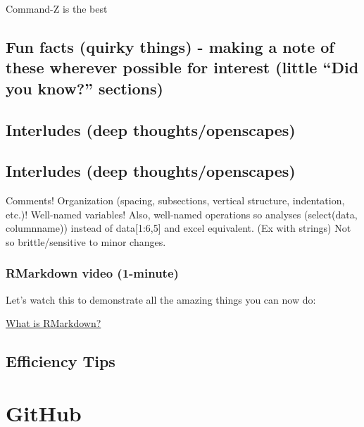 \documentclass[]{book}
\begin{document}
Command-Z is the best

\hypertarget{fun-facts-quirky-things---making-a-note-of-these-wherever-possible-for-interest-little-did-you-know-sections}{%
\section{Fun facts (quirky things) - making a note of these wherever possible for interest (little ``Did you know?'' sections)}\label{fun-facts-quirky-things---making-a-note-of-these-wherever-possible-for-interest-little-did-you-know-sections}}

\hypertarget{interludes-deep-thoughtsopenscapes}{%
\section{Interludes (deep thoughts/openscapes)}\label{interludes-deep-thoughtsopenscapes}}

\hypertarget{interludes-deep-thoughtsopenscapes-1}{%
\section{Interludes (deep thoughts/openscapes)}\label{interludes-deep-thoughtsopenscapes-1}}

Comments! Organization (spacing, subsections, vertical structure, indentation, etc.)! Well-named variables! Also, well-named operations so analyses (select(data, columnname)) instead of data{[}1:6,5{]} and excel equivalent. (Ex with strings)
Not so brittle/sensitive to minor changes.

\hypertarget{rmarkdown-video-1-minute}{%
\subsection{RMarkdown video (1-minute)}\label{rmarkdown-video-1-minute}}

Let's watch this to demonstrate all the amazing things you can now do:

\href{https://vimeo.com/178485416}{What is RMarkdown?}

\hypertarget{efficiency-tips-1}{%
\section{Efficiency Tips}\label{efficiency-tips-1}}

\hypertarget{github}{%
\chapter{GitHub}\label{github}}
\end{document}
